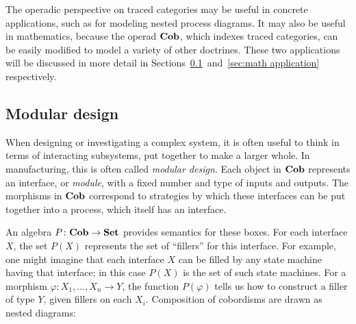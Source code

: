 \documentclass[12pt,oneside,article,draft]{memoir}
\begin{document}
The operadic perspective on traced categories may be useful in concrete applications, such as for modeling nested process diagrams.
It may also be useful in mathematics, because the operad $\mathbf{Cob}$, which indexes traced categories, can be easily modified to model a variety of other doctrines.
These two applications will be discussed in more detail in Sections~\ref{sec:modular}~and~\ref{sec:math application} respectively.

\subsection{Modular design}\label{sec:modular}

When designing or investigating a complex system, it is often useful to think in terms of interacting subsystems, put together to make a larger whole.
In manufacturing, this is often called \emph{modular design}.
Each object in $\mathbf{Cob}$ represents an interface, or \emph{module}, with a fixed number and type of inputs and outputs.
The morphisms in $\mathbf{Cob}$ correspond to strategies by which these interfaces can be put together into a process, which itself has an interface.

An algebra $P\colon\mathbf{Cob}\to\mathbf{Set}$ provides semantics for these boxes.
For each interface $X$, the set $P(X)$ represents the set of ``fillers'' for this interface.
For example, one might imagine that each interface $X$ can be filled by any state machine having that interface; in this case $P(X)$ is the set of such state machines.
For a morphism $\varphi\colon X_1,\ldots,X_n\to Y$, the function $P(\varphi)$ tells us how to construct a filler of type $Y$, given fillers on each $X_i$.
Composition of cobordisms are drawn as nested diagrams:
\end{document}
